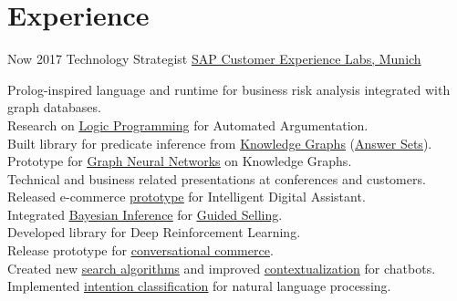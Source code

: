 \documentclass[letterpaper]{twentysecondcv} %
\begin{document}
 \makeprofile %


\section{Experience}

\begin{twenty} %
\twentyitem
    	{Now}
		{2017}
        {Technology Strategist}
        {\href{https://cxlabs.sap.com/}{SAP Customer Experience Labs, Munich}}
        {}
        {
        Prolog-inspired language and runtime for business risk analysis integrated with graph databases.\\
        Research on \href{https://cxlabs.sap.com/2020/11/16/why-logic-programming-matters/}{\underline{Logic Programming}} for Automated Argumentation.\\
        Built library for predicate inference from \href{https://cxlabs.sap.com/2020/08/14/what-are-knowledge-graphs-an-overview/}{\underline{Knowledge Graphs}} (\href{https://cxlabs.sap.com/2020/11/24/rule-engines-and-knowledge-intensive-processing-with-answer-set-programming/}{\underline{Answer Sets}}).
        Prototype for \href{https://cxlabs.sap.com/2020/08/31/deep-learning-for-knowledge-graph-embeddings/}{\underline{Graph Neural Networks}} on Knowledge Graphs.\\
        Technical and business related presentations at conferences and customers.\\ 
        Released e-commerce \href{https://zefiro.cxlabs.sap.com}{\underline{prototype}} for Intelligent Digital Assistant.\\ 
        Integrated \href{https://github.com/sap/bayesian-network-builder}{\underline{Bayesian Inference}} for \href{https://cxlabs.sap.com/2020/09/22/bayesian-inference-for-guided-selling-sap-predictive-summit-talk/}{\underline{Guided Selling}}.\\
        Developed library for Deep Reinforcement Learning.\\
        Release prototype for \href{https://sapvideoa35699dc5.hana.ondemand.com/?entry_id=1_kp5hbyih}{\underline{conversational commerce}}.\\
        Created new \href{https://cxlabs.sap.com/tag/charly/}{\underline{search algorithms}} and improved \href{https://cxlabs.sap.com/2018/03/20/stochastic-conversational-workflows/}{\underline{contextualization}}  for chatbots. \\
        Implemented \href{https://gfrison.com/2017/09/01/deeplearning-in-text-classification/}{\underline{intention classification}} for natural language processing.
        
}
\end{twenty}
\end{document}
